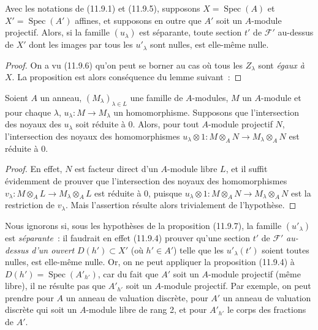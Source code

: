 \begin{proposition}[11.9.7]
\label{IV.11.9.7-fr}
Avec les notations de \textup{(11.9.1)} et \textup{(11.9.5)}, supposons
$X=\operatorname{Spec}(A)$ et $X'=\operatorname{Spec}(A')$ affines, et
supposons en outre que $A'$ soit un $A$-module projectif. Alors, si la famille
$(u_\lambda)$ est séparante, toute section $t'$ de $\mathcal F'$ au-dessus de
$X'$ dont les images par tous les $u'_\lambda$ sont nulles, est elle-même
nulle.
\end{proposition}

\begin{proof}
On a vu (11.9.6) qu'on peut se borner au cas où tous les $Z_\lambda$ sont \emph{égaux
à} $X$. La proposition est alors conséquence du lemme suivant~:
\end{proof}

\begin{lemma}[11.9.7.1]
\label{IV.11.9.7.1-fr}
Soient $A$ un anneau, $(M_\lambda)_{\lambda\in L}$ une famille de $A$-modules,
$M$ un $A$-module et pour chaque $\lambda$,
$u_\lambda:M\to M_\lambda$ un homomorphisme. Supposons que l'intersection des
noyaux des $u_\lambda$ soit réduite à 0. Alors, pour tout $A$-module projectif
$N$, l'intersection des noyaux des homomorphismes
$u_\lambda\otimes 1:M\otimes_A N\to M_\lambda\otimes_A N$ est réduite à 0.
\end{lemma}

\begin{proof}
En effet, $N$ est facteur direct d'un $A$-module libre $L$, et il suffit
évidemment de prouver que l'intersection des noyaux des homomorphismes
$v_\lambda:M\otimes_A L\to M_\lambda\otimes_A L$ est réduite à 0, puisque
$u_\lambda\otimes 1:M\otimes_A N\to M_\lambda\otimes_A N$ est la restriction
de $v_\lambda$. Mais l'assertion résulte alors trivialement de l'hypothèse.
\end{proof}

\begin{remark}[11.9.8]
\label{IV.11.9.8-fr}
Nous ignorons si, sous les hypothèses de la proposition (11.9.7), la famille
$(u'_\lambda)$ est \emph{séparante}~: il faudrait en effet (11.9.4) prouver
qu'une section $t'$ de $\mathcal F'$ \emph{au-dessus d'un ouvert}
$D(h')\subset X'$ (où $h'\in A'$) telle que les $u'_\lambda(t')$ soient toutes
nulles, est elle-même nulle. Or, on ne peut appliquer la proposition (11.9.4)
à $D(h')=\operatorname{Spec}(A'_{h'})$, car du fait que $A'$ soit un
$A$-module projectif (même libre), il ne résulte pas que $A'_{h'}$ soit un
$A$-module projectif. Par exemple, on peut prendre pour $A$ un anneau de
valuation discrète, pour $A'$ un anneau de valuation discrète qui soit un
$A$-module libre de rang 2, et pour $A'_{h'}$ le corps des fractions de $A'$.
\end{remark}


